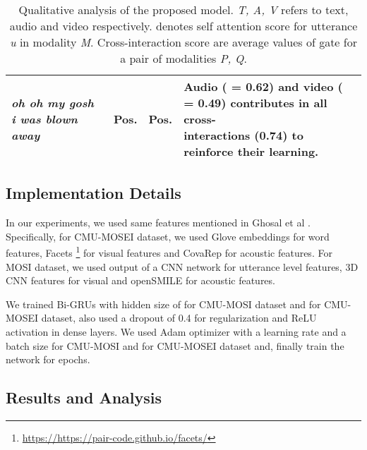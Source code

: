 \documentclass{article}
\begin{document}
\begin{table*}[]
\begin{tabular}{l|c|c|l}
\textit{oh oh my gosh i was blown away}                                                                                                                            & Pos.                                                          & Pos.                                                               & \makecell{Audio ( = 0.62) and video ( = 0.49) contributes in all cross-\\interactions (0.74) to reinforce their learning.}                                                                                                                                                                                                                                         \\ \hline
\end{tabular}
\caption{Qualitative analysis of the proposed model. \textit{T, A, V} refers to text, audio and video respectively.  denotes self attention score for utterance \textit{u} in modality \textit{M}. Cross-interaction score are average values of gate \textit{} for a pair of modalities \textit{P, Q}.}
\label{tab:qualitative}
\end{table*}



\subsection{Implementation Details}
In our experiments, we used same features mentioned in Ghosal et al \cite{DBLP:conf/emnlp/GhosalACPEB18}. Specifically, for CMU-MOSEI dataset, we used Glove embeddings for word features, Facets \footnote{ \url{https://https://pair-code.github.io/facets/}} for visual features and CovaRep \cite{DBLP:conf/icassp/DegottexKDRS14} for acoustic features. For MOSI dataset, we used output of a CNN network for utterance level features, 3D CNN features for visual and openSMILE \cite{eyben2013recent} for acoustic features.

We trained Bi-GRUs with hidden size of  for CMU-MOSI dataset and  for CMU-MOSEI dataset, also used a dropout of 0.4 for regularization and ReLU activation \cite{DBLP:conf/icml/NairH10} in dense layers. We used Adam optimizer \cite{DBLP:journals/corr/KingmaB14} with a learning rate  and a batch size  for CMU-MOSI and  for CMU-MOSEI dataset and, finally train the network for  epochs.







\subsection{Results and Analysis}
\end{document}
